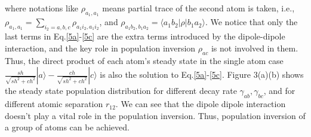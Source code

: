 \documentclass[aps,showpacs,twocolumn,twoside,groupedaddress]{revtex4}
\begin{document}
where notations like $\rho_{a_1, a_1}$ means partial trace of the second atom is taken, i.e., $\rho_{a_1, a_1}=\sum_{i_2=a,b,c}\rho_{a_1i_2, a_1i_2}$, and $\rho_{a_1b_2, b_1a_2}=\langle a_1b_2|\rho|b_1a_2\rangle$. We notice that only the last terms in Eq.\eqref{5a}-\eqref{5c} are the extra terms introduced by the dipole-dipole interaction, and the key role in population inversion $\rho_{ac}$ is not involved in them. Thus, the direct product of each atom's steady state in the single atom case $\frac{sh}{\sqrt{sh^{2}+ch^{2}}}|a\rangle-\frac{ch}{\sqrt{sh^{2}+ch^{2}}}|c\rangle$ is also the solution to Eq.\eqref{5a}-\eqref{5c}. Figure 3(a)(b) shows the steady state population distribution for different decay rate $\gamma_{ab}, \gamma_{bc}$, and for different atomic separation $r_{12}$. We can see that the dipole dipole interaction doesn't play a vital role in the population inversion. Thus, population inversion of a group of atoms can be achieved.
\end{document}
